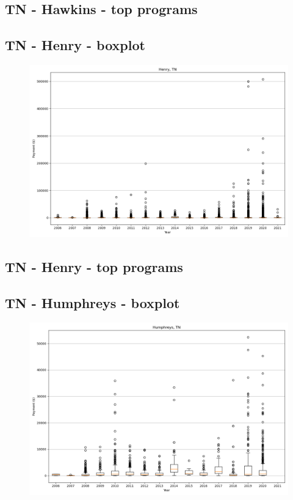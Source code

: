 \subsection*{TN - Hawkins - top programs}

\newpage
\subsection*{TN - Henry - boxplot}
\begin{figure}[h]
\centering
\includegraphics[width=7in]{../output/boxplots/counties/Henry-TN_boxplot.png}
\end{figure}


\subsection*{TN - Henry - top programs}

\newpage
\subsection*{TN - Humphreys - boxplot}
\begin{figure}[h]
\centering
\includegraphics[width=7in]{../output/boxplots/counties/Humphreys-TN_boxplot.png}
\end{figure}


